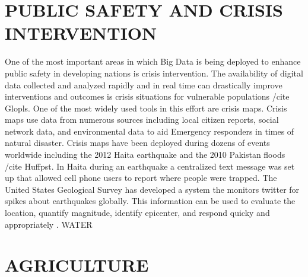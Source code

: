 \documentclass[sigconf]{acmart}
\begin{document}
{\section{PUBLIC SAFETY AND CRISIS INTERVENTION}

One of the most important areas in which Big Data is being deployed to enhance public safety in developing nations is crisis intervention. The availability of digital data collected and analyzed rapidly and in real time can drastically improve interventions and outcomes is crisis situations for vulnerable populations  /cite {Glopls}.  One of the most widely used tools in this effort are crisis maps. Crisis maps use data from numerous sources including local citizen reports, social network data, and environmental data to aid Emergency responders in times of natural disaster. Crisis maps have been deployed during dozens of events worldwide including the 2012 Haita earthquake and the 2010 Pakistan floods /cite {Huffpst}.
In Haita during an earthquake a centralized text message was set up that allowed cell phone users to report where people were trapped. The United States Geological Survey has developed a system the monitors twitter for spikes about earthquakes globally. This information can be used to evaluate the location, quantify magnitude, identify epicenter, and respond quicky and appropriately \cite{Glopls}.
WATER


\section{AGRICULTURE}

}
\end{document}
